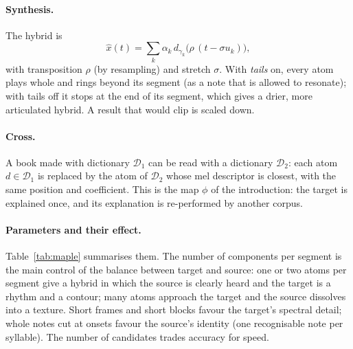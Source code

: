 \documentclass[11pt,a4paper]{article}
\newcommand{\D}{\mathcal{D}}
\begin{document}
\paragraph{Synthesis.} The hybrid is
\begin{equation}
  \hat x(t) = \sum_k \alpha_k \, d_{\gamma_k}\!\bigl(\rho\,(t - \sigma u_k)\bigr),
\end{equation}
with transposition $\rho$ (by resampling) and stretch $\sigma$. With
\emph{tails} on, every atom plays whole and rings beyond its segment (as a
note that is allowed to resonate); with tails off it stops at the end of its
segment, which gives a drier, more articulated hybrid. A result that would
clip is scaled down.

\paragraph{Cross.} A book made with dictionary $\D_1$ can be read with a
dictionary $\D_2$: each atom $d \in \D_1$ is replaced by the atom of $\D_2$
whose mel descriptor is closest, with the same position and coefficient.
This is the map $\phi$ of the introduction: the target is explained once,
and its explanation is re-performed by another corpus.

\paragraph{Parameters and their effect.} Table~\ref{tab:maple} summarises
them. The number of components per segment is the main control of the
balance between target and source: one or two atoms per segment give a
hybrid in which the source is clearly heard and the target is a rhythm and a
contour; many atoms approach the target and the source dissolves into a
texture. Short frames and short blocks favour the target's spectral detail;
whole notes cut at onsets favour the source's identity (one recognisable
note per syllable). The number of candidates trades accuracy for speed.
\end{document}
